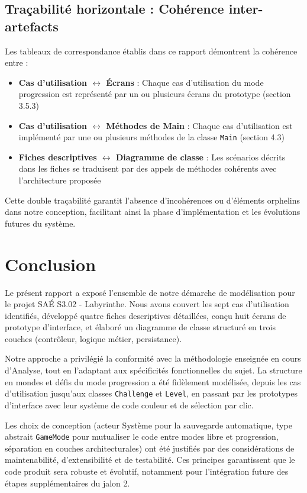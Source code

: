 \documentclass{butexFR}
\begin{document}
\subsection{Traçabilité horizontale : Cohérence inter-artefacts}

Les tableaux de correspondance établis dans ce rapport démontrent la cohérence entre :

\begin{itemize}
    \item \textbf{Cas d'utilisation $\leftrightarrow$ Écrans} : Chaque cas d'utilisation du mode progression est représenté par un ou plusieurs écrans du prototype (section 3.5.3)
    \item \textbf{Cas d'utilisation $\leftrightarrow$ Méthodes de Main} : Chaque cas d'utilisation est implémenté par une ou plusieurs méthodes de la classe \texttt{Main} (section 4.3)
    \item \textbf{Fiches descriptives $\leftrightarrow$ Diagramme de classe} : Les scénarios décrits dans les fiches se traduisent par des appels de méthodes cohérents avec l'architecture proposée
\end{itemize}

Cette double traçabilité garantit l'absence d'incohérences ou d'éléments orphelins dans notre conception, facilitant ainsi la phase d'implémentation et les évolutions futures du système.

\section{Conclusion}

Le présent rapport a exposé l'ensemble de notre démarche de modélisation pour le projet SAÉ S3.02 - Labyrinthe. Nous avons couvert les sept cas d'utilisation identifiés, développé quatre fiches descriptives détaillées, conçu huit écrans de prototype d'interface, et élaboré un diagramme de classe structuré en trois couches (contrôleur, logique métier, persistance).

Notre approche a privilégié la conformité avec la méthodologie enseignée en cours d'Analyse, tout en l'adaptant aux spécificités fonctionnelles du sujet. La structure en mondes et défis du mode progression a été fidèlement modélisée, depuis les cas d'utilisation jusqu'aux classes \texttt{Challenge} et \texttt{Level}, en passant par les prototypes d'interface avec leur système de code couleur et de sélection par clic.

Les choix de conception (acteur Système pour la sauvegarde automatique, type abstrait \texttt{GameMode} pour mutualiser le code entre modes libre et progression, séparation en couches architecturales) ont été justifiés par des considérations de maintenabilité, d'extensibilité et de testabilité. Ces principes garantissent que le code produit sera robuste et évolutif, notamment pour l'intégration future des étapes supplémentaires du jalon 2.
\end{document}
